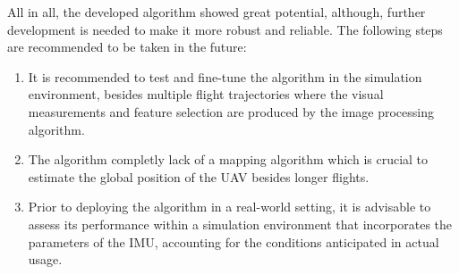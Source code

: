 All in all, the developed algorithm showed great potential, although, further development is needed to make it more robust and reliable. The following steps are recommended to be taken in the future:
\begin{enumerate}
    \item It is recommended to test and fine-tune the algorithm in the simulation environment, besides multiple flight trajectories where the visual measurements and feature selection are produced by the image processing algorithm.
    \item The algorithm completly lack of a mapping algorithm which is crucial to estimate the global position of the UAV besides longer flights.
    \item Prior to deploying the algorithm in a real-world setting, it is advisable to assess its performance within a simulation environment that incorporates the parameters of the IMU, accounting for the conditions anticipated in actual usage.
\end{enumerate}